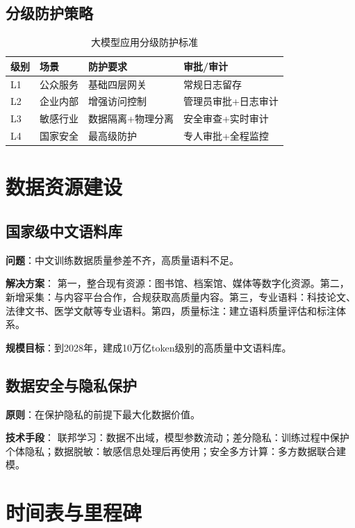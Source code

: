 \subsection{分级防护策略}

\begin{table}[H]
\centering
\caption{大模型应用分级防护标准}
\small
\begin{tabular}{p{1.5cm}p{2.5cm}p{3.5cm}p{4cm}}
\toprule
\textbf{级别} & \textbf{场景} & \textbf{防护要求} & \textbf{审批/审计} \\
\midrule
L1 & 公众服务 & 基础四层网关 & 常规日志留存 \\
L2 & 企业内部 & 增强访问控制 & 管理员审批+日志审计 \\
L3 & 敏感行业 & 数据隔离+物理分离 & 安全审查+实时审计 \\
L4 & 国家安全 & 最高级防护 & 专人审批+全程监控 \\
\bottomrule
\end{tabular}
\end{table}

\section{数据资源建设}

\subsection{国家级中文语料库}

\textbf{问题}：中文训练数据质量参差不齐，高质量语料不足。

\textbf{解决方案}：
第一，整合现有资源：图书馆、档案馆、媒体等数字化资源。第二，新增采集：与内容平台合作，合规获取高质量内容。第三，专业语料：科技论文、法律文书、医学文献等专业语料。第四，质量标注：建立语料质量评估和标注体系。

\textbf{规模目标}：到2028年，建成10万亿token级别的高质量中文语料库。

\subsection{数据安全与隐私保护}

\textbf{原则}：在保护隐私的前提下最大化数据价值。

\textbf{技术手段}：
联邦学习：数据不出域，模型参数流动；差分隐私：训练过程中保护个体隐私；数据脱敏：敏感信息处理后再使用；安全多方计算：多方数据联合建模。

\section{时间表与里程碑}

